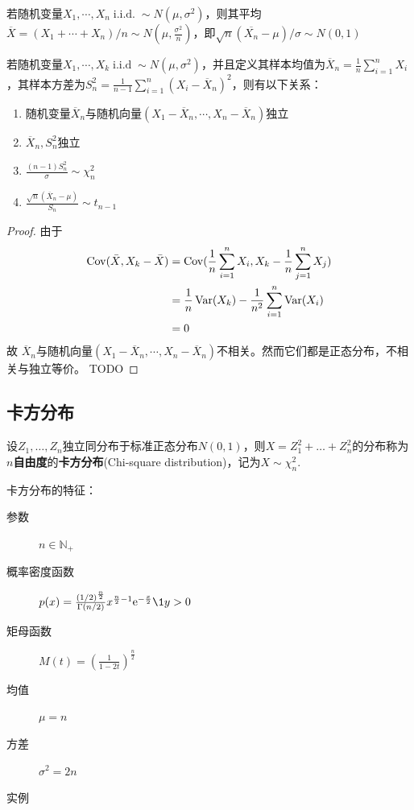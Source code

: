 \begin{corollary}
    若随机变量$X_1,\cdots ,X_n \operatorname{i.i.d.} \sim N(\mu,\sigma^2)$，则其平均$\overline{X}=(X_1+\cdots +X_n)/n \sim N(\mu,\frac{\sigma^2}{n})$，即$\sqrt{n}(\overline{X_n}-\mu)/\sigma \sim N(0,1)$
\end{corollary}

\begin{theorem}[fisher引理]\label{thm:fisher_lemma}
    若随机变量$X_1,\cdots ,X_k \operatorname{i.i.d} \sim N(\mu,\sigma^2)$，并且定义其样本均值为$\overline{X}_n=\frac{1}{n}\sum_{i=1}^n X_i$，其样本方差为$S_n^2=\frac{1}{n-1}\sum_{i=1}^n (X_i-\overline{X}_n)^2$，则有以下关系：
    \begin{enumerate}
        \item 随机变量$\overline{X}_n$与随机向量$(X_1-\overline{X}_n,\cdots ,X_n-\overline{X}_n)$独立
        \item $\overline{X}_n,S_n^2$独立
        \item $\frac{(n-1)S_n^2}{\sigma} \sim \chi_n^2$
        \item $\frac{\sqrt{n}(\overline{X}_n-\mu)}{S_n} \sim t_{n-1}$
    \end{enumerate}
\end{theorem}
\begin{proof}
    由于
    \begin{align*}
        \operatorname{Cov}(\bar{X},X_k-\bar{X})&=\operatorname{Cov}(\frac1{n}\sum_{i=1}^n X_i,X_k-\frac1{n}\sum_{j=1}^n X_j)\\
        &=\frac1{n} \operatorname{Var}(X_k)-\frac1{n^2} \sum_{i=1}^n \operatorname{Var}(X_i)\\
        &=0
    \end{align*}
    故 $\overline{X}_n$与随机向量$(X_1-\overline{X}_n,\cdots ,X_n-\overline{X}_n)$不相关。然而它们都是正态分布，不相关与独立等价。
    TODO
\end{proof}

\subsection{卡方分布}

\begin{definition}
    设$Z_1,\dotsc,Z_n$独立同分布于标准正态分布$N(0,1)$，则$X=Z_1^2+\dotsc+Z_n^2$的分布称为\textbf{$n$自由度}的\textbf{卡方分布}(Chi-square distribution)，记为$X \sim \chi^2_n$.
\end{definition}

卡方分布的特征：
\begin{description}
    \item[参数] $n \in \mathbb{N}_+$
    \item[概率密度函数] $p(x)= \frac{(1/2)^{\frac n2}}{\Gamma(n/2)}x^{\frac n2-1}\ee^{-\frac x2} \1{y>0} $
    \item[矩母函数] $M(t)=(\frac{1}{1-2t})^{\frac{n}{2}}$
    \item[均值] $\mu=n$
    \item[方差] $\sigma^2=2n$
    \item[实例]
\end{description}

